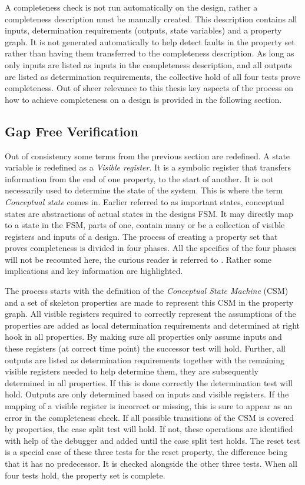 A completeness check is not run automatically on the design, rather a completeness description must be manually created. This description contains all inputs, determination requirements (outputs, state variables) and a property graph. It is not generated automatically to help detect faults in the property set rather than having them transferred to the completeness description. As long as only inputs are listed as inputs in the completeness description, and all outputs are listed as determination requirements, the collective hold of all four tests prove completeness. Out of sheer relevance to this thesis key aspects of the process on how to achieve completeness on a design is provided in the following section. 

\subsection{Gap Free Verification}
\label{sub:gfv}
Out of consistency some terms from the previous section are redefined. A state variable is redefined as a \textit{Visible register}. It is a symbolic register that transfers information from the end of one property, to the start of another. It is not necessarily used to determine the state of the system. This is where the term \textit{Conceptual state} comes in. Earlier referred to as important states, conceptual states are abstractions of actual states in the designs FSM. It may directly map to a state in the FSM, parts of one,  contain many or be a collection of visible registers and inputs of a design. The process of creating a property set that proves completeness is divided in four phases. All the specifics of the four phases will not be recounted here, the curious reader is referred to \cite{gapfree}. Rather some implications and key information are highlighted. \par
The process starts with the definition of the \textit{Conceptual State Machine} (CSM) and a set of skeleton properties are made to represent this CSM in the property graph. All visible registers required to correctly represent the assumptions of the properties are added as local determination requirements and determined at right hook in all properties. By making sure all properties only assume inputs and these registers (at correct time point) the successor test will hold. Further, all outputs are listed as determination requirements together with the remaining visible registers needed to help determine them, they are subsequently determined in all properties. If this is done correctly the determination test will hold. Outputs are only determined based on inputs and visible registers. If the mapping of a visible register is incorrect or missing, this is sure to appear as an error in the completeness check. If all possible transitions of the CSM is covered by properties, the case split test will hold. If not, these operations are identified with help of the debugger and added until the case split test holds. The reset test is a special case of these three tests for the reset property, the difference being that it has no predecessor. It is checked alongside the other three tests. When all four tests hold, the property set is complete. 

